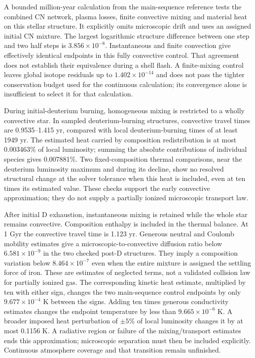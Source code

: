 \documentclass[11pt,letterpaper]{article}
\begin{document}
A bounded million-year calculation from the main-sequence reference tests
the combined CN network, plasma losses, finite convective mixing and material
heat on this stellar structure. It explicitly omits microscopic drift and
uses an assigned initial CN mixture. The largest logarithmic structure
difference between one step and two half steps is $3.856\times10^{-8}$.
Instantaneous and finite convection give effectively identical endpoints
in this fully convective control. That agreement does not establish their
equivalence during a shell flash. A finite-mixing control leaves global
isotope residuals up to $1.402\times10^{-14}$ and does not pass
the tighter conservation budget used for the continuous calculation;
its convergence alone is insufficient to select it for that calculation.

During initial-deuterium burning, homogeneous mixing is restricted to a
wholly convective star. In sampled deuterium-burning structures, convective
travel times are 0.9535--1.415 yr, compared with local
deuterium-burning times of at least 1949 yr. The estimated heat carried by
composition redistribution is at most 0.003463\% of local luminosity;
summing the absolute contributions of individual species gives 0.007881\%.
Two fixed-composition thermal comparisons, near the deuterium luminosity
maximum and during its decline, show no resolved structural change at the
solver tolerance when this heat is included, even at ten times its estimated
value. These checks support the early convective approximation;
they do not supply a partially ionized microscopic transport law.

After initial D exhaustion, instantaneous mixing is retained while the whole
star remains convective. Composition enthalpy is included in the thermal
balance. At 1 Gyr the convective travel time is 1.123 yr. Generous neutral
and Coulomb mobility estimates give a microscopic-to-convective diffusion
ratio below $6.581\times10^{-9}$ in the two checked post-D structures.
They imply a composition variation below $8.464\times10^{-7}$ even when the
entire mixture is assigned the settling force of iron. These are estimates
of neglected terms, not a validated collision law for partially ionized gas.
The corresponding kinetic heat estimate, multiplied by ten with either
sign, changes the two main-sequence control endpoints by only
$9.677\times10^{-4}$ K between the signs. Adding ten times generous
conductivity estimates changes the endpoint temperature by less than
$9.665\times10^{-6}$ K. A broader imposed heat perturbation of
$\pm5\%$ of local luminosity changes it by at most 0.1156 K.
A radiative region or failure of the mixing/transport estimates ends this
approximation; microscopic separation must then be included explicitly.
Continuous atmosphere coverage and that transition remain unfinished.
\end{document}
